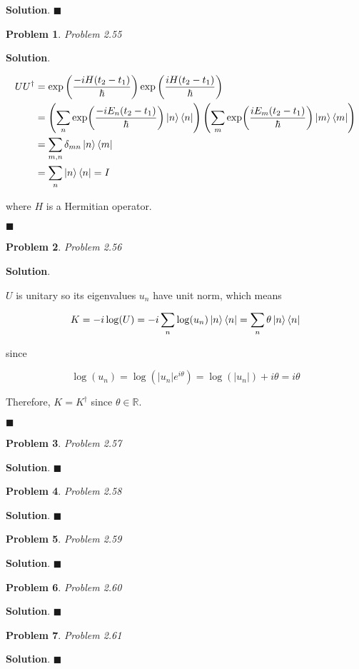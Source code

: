 \documentclass[12pt]{article}
\newtheorem{p}{Problem}
\theoremstyle{definition}
\newenvironment{s}{%
        \begin{trivlist} \item \textbf{Solution}. }{%
            \hspace*{\fill} $\blacksquare$\end{trivlist}}%
\begin{document}
{\begin{s}
\end{s}

\begin{p}
Problem 2.55
\end{p}

\begin{s}

\begin{align*}
UU^{\dagger} &= \exp\left(\frac{-iH(t_2-t_1)}{\hbar}\right)\exp\left(\frac{iH(t_2-t_1)}{\hbar}\right)\\
&= \left(\sum_{n} \exp(\frac{-i E_{n}(t_2-t_1)}{\hbar})\ket{n}\bra{n}\right)\left(\sum_{m} \exp(\frac{i E_{m}(t_2-t_1)}{\hbar})\ket{m}\bra{m}\right)\\
&= \sum_{m,n}\delta_{mn}\ket{n}\bra{m}\\
&= \sum_{n}\ket{n}\bra{n} = I
\end{align*}

where $H$ is a Hermitian operator. 


\end{s}

\begin{p}
Problem 2.56
\end{p}

\begin{s}

$U$ is unitary so its eigenvalues $u_{n}$ have unit norm, which means

\begin{equation*}
K = -i\log(U) = -i\sum_{n}\log(u_{n})\ket{n}\bra{n} = \sum_{n}\theta \ket{n}\bra{n}
\end{equation*}

since

\begin{equation*}
\log(u_{n}) = \log(|u_{n}|e^{i\theta}) = \log(|u_{n}|) + i\theta = i\theta
\end{equation*}

Therefore, $K = K^{\dagger}$ since $\theta\in\mathbb{R}$.

\end{s}

\begin{p}
Problem 2.57
\end{p}

\begin{s}
\end{s}

\begin{p}
Problem 2.58
\end{p}

\begin{s}
\end{s}

\begin{p}
Problem 2.59
\end{p}

\begin{s}
\end{s}

\begin{p}
Problem 2.60
\end{p}

\begin{s}
\end{s}
\begin{p}
Problem 2.61
\end{p}

\begin{s}
\end{s}
\end{document}
